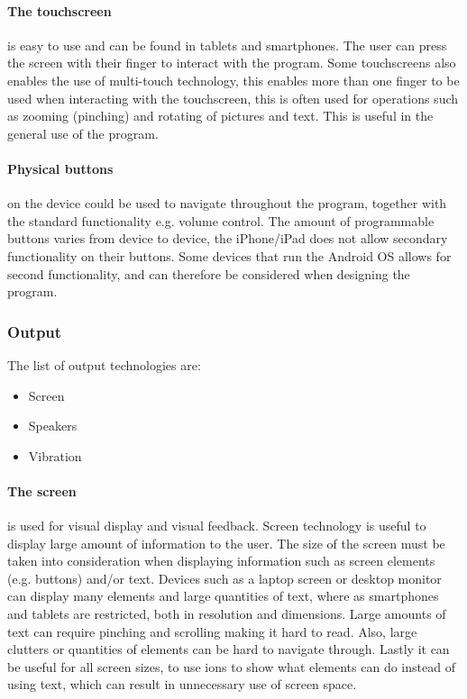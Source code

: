 \paragraph{The touchscreen} is easy to use and can be found in tablets and smartphones. The user can press the screen with their finger to interact with the program. Some touchscreens also enables the use of multi-touch technology, this enables more than one finger to be used when interacting with the touchscreen, this is often used for operations such as zooming (pinching) and rotating of pictures and text. This is useful in the general use of the program.

\paragraph{Physical buttons} on the device could be used to navigate throughout the program, together with the standard functionality e.g. volume control. The amount of programmable buttons varies from device to device, the iPhone/iPad does not allow secondary functionality on their buttons. Some devices that run the Android OS allows for second functionality\cite{android_Rebind}, and can therefore be considered when designing the program.

\subsubsection{Output}
The list of output technologies are:
\begin{itemize}
    \item Screen
    \item Speakers
    \item Vibration
\end{itemize}

\paragraph{The screen} is used for visual display and visual feedback. Screen technology is useful to display large amount of information to the user.
The size of the screen must be taken into consideration when displaying information such as screen elements (e.g. buttons) and/or text.
Devices such as a laptop screen or desktop monitor can display many elements and large quantities of text, where as smartphones and tablets are restricted, both in resolution and dimensions. Large amounts of text can require pinching and scrolling making it hard to read. Also, large clutters or quantities of elements can be hard to navigate through. Lastly it can be useful for all screen sizes, to use ions to show what elements can do instead of using text, which can result in unnecessary use of screen space.

